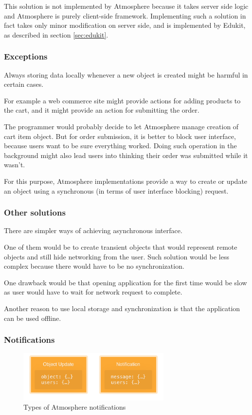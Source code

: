 This solution is not implemented by Atmosphere because it takes server side logic and Atmosphere is purely client-side framework. Implementing such a solution in fact takes only minor modification on server side, and is implemented by Edukit, as described in section \ref{sec:edukit}.

\subsubsection{Exceptions}

Always storing data locally whenever a new object is created might be harmful in certain cases.

For example a web commerce site might provide actions for adding products to the cart, and it might provide an action for submitting the order.

The programmer would probably decide to let Atmosphere manage creation of cart item object. But for order submission, it is better to block user interface, because users want to be sure everything worked. Doing such operation in the background might also lead users into thinking their order was submitted while it wasn't.

For this purpose, Atmosphere implementations provide a way to create or update an object using a synchronous (in terms of user interface blocking) request. 

\subsubsection{Other solutions}

There are simpler ways of achieving asynchronous interface.

One of them would be to create transient objects that would represent remote objects and still hide networking from the user. Such solution would be less complex because there would have to be no synchronization.

 One drawback would be that opening application for the first time would be slow as user would have to wait for network request to complete. 

Another reason to use local storage and synchronization is that the application can be used offline.

\subsubsection{Notifications}

\begin{figure}[htbp]
  \centering
    \includegraphics[width=3in]{figures/Notifications.png}
  \caption{Types of Atmosphere notifications}
  \label{fig:figures_NotificationServer}
\end{figure}


